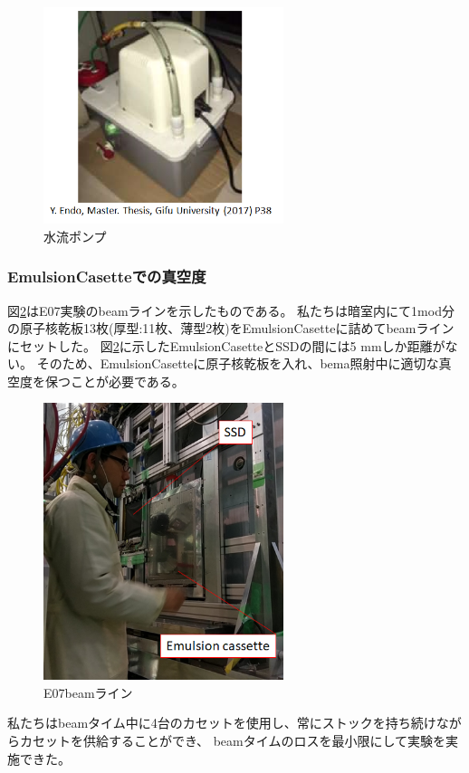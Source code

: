 \documentclass[12pt,a4paper]{jarticle}
\begin{document}
\begin{figure}[htbp]
  \centering
    \includegraphics[width=70mm]{ponpu.png}
  \caption{水流ポンプ\label{fig:ponpu}}
\end{figure}
\newpage
\subsubsection{EmulsionCasetteでの真空度}
図\ref{fig:e07setup_real}はE07実験のbeamラインを示したものである。
私たちは暗室内にて1mod分の原子核乾板13枚(厚型:11枚、薄型2枚)をEmulsionCasetteに詰めてbeamラインにセットした。
図\ref{fig:e07setup_real}に示したEmulsionCasetteとSSDの間には5 mmしか距離がない。
そのため、EmulsionCasetteに原子核乾板を入れ、bema照射中に適切な真空度を保つことが必要である。
\begin{figure}[htbp]
  \centering
    \includegraphics[width=70mm]{e07setup_real.png}
  \caption{E07beamライン\label{fig:e07setup_real}}
\end{figure}
\newpage
\par
私たちはbeamタイム中に4台のカセットを使用し、常にストックを持ち続けながらカセットを供給することができ、
beamタイムのロスを最小限にして実験を実施できた。
\end{document}
